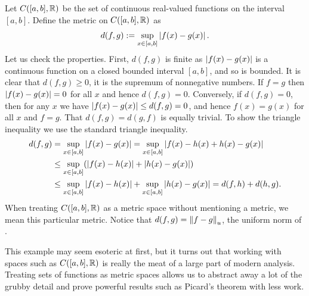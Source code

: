 \begin{example} \label{example:msC01}
Let $C([a,b],{\mathbb{R}})$ be the set of continuous real-valued functions on the
interval $[a,b]$.  Define the metric on $C([a,b],{\mathbb{R}})$ as
\begin{equation*}
d(f,g) := \sup_{x \in [a,b]} \left\lvert {f(x)-g(x)} \right\rvert .
\end{equation*}
Let us check the properties.  First, $d(f,g)$ is finite as
$\left\lvert {f(x)-g(x)} \right\rvert$ is a continuous function on a closed bounded interval
$[a,b]$, and so is bounded.
It is clear that $d(f,g) \geq 0$, 
it is the supremum of nonnegative numbers.  If $f = g$
then $\left\lvert {f(x)-g(x)} \right\rvert = 0$ for all $x$ and hence $d(f,g) = 0$.  Conversely,
if $d(f,g) = 0$, then for any $x$ we have $\left\lvert {f(x)-g(x)} \right\rvert \leq d(f,g) = 0$,
and hence $f(x) = g(x)$ for all $x$ and $f=g$.  That $d(f,g) = d(g,f)$
is equally trivial.  To show the triangle inequality we use the standard
triangle inequality.
\begin{equation*}
\begin{split}
d(f,g) & =
\sup_{x \in [a,b]} \left\lvert {f(x)-g(x)} \right\rvert =
\sup_{x \in [a,b]} \left\lvert {f(x)-h(x)+h(x)-g(x)} \right\rvert
\\
& \leq
\sup_{x \in [a,b]} ( \left\lvert {f(x)-h(x)} \right\rvert+\left\lvert {h(x)-g(x)} \right\rvert )
\\
& \leq
\sup_{x \in [a,b]} \left\lvert {f(x)-h(x)} \right\rvert+
\sup_{x \in [a,b]} \left\lvert {h(x)-g(x)} \right\rvert = d(f,h) + d(h,g) .
\end{split}
\end{equation*}
When treating $C([a,b],{\mathbb{R}})$ as a metric space without mentioning a metric, we mean this
particular metric.
Notice that $d(f,g) = \left\lVert {f-g} \right\rVert_u$, the uniform norm of .

This example may seem esoteric at first, but it turns out that working with
spaces such as $C([a,b],{\mathbb{R}})$ is really the meat of a large part of modern 
analysis.  Treating sets of functions as metric spaces allows us to
abstract away a lot of the grubby detail and prove powerful results such as
Picard's theorem with less work.
\end{example}

